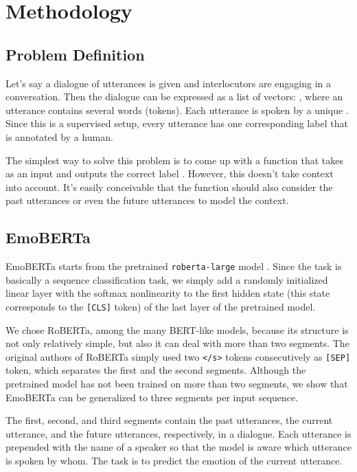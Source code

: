 \documentclass[11pt]{article}
\begin{document}
\section{Methodology}
\label{sec:method}

\subsection{Problem Definition}

Let's say a dialogue of  utterances is given and  interlocutors are engaging in a conversation. Then the dialogue can be expressed as a list of vectors: ,  where an utterance  contains several words (tokens). Each utterance  is spoken by a unique  . Since this is a supervised setup, every utterance  has one corresponding label  that is annotated by a human. 

The simplest way to solve this problem is to come up with a function  that takes  as an input and outputs the correct label . However, this doesn't take context into account. It's easily conceivable that the function  should also consider the past utterances  or even the future utterances  to model the context.


\subsection{EmoBERTa}

EmoBERTa starts from the pretrained \texttt{roberta-large} model \citep{liu2019roberta}. Since the task is basically a sequence classification task, we simply add a randomly initialized linear layer with the softmax nonlinearity to the first hidden state (this state corresponds to the \texttt{[CLS]} token) of the last layer of the pretrained model. 

We chose RoBERTa, among the many BERT-like models, because its structure is not only relatively simple, but also it can deal with more than two segments. The original authors of RoBERTa simply used two \texttt{</s>} tokens consecutively as \texttt{[SEP]} token, which separates the first and the second segments. Although the pretrained model has not been trained on more than two segments, we show that EmoBERTa can be generalized to three segments per input sequence. 

The first, second, and third segments contain the past utterances, the current utterance, and the future utterances, respectively, in a dialogue. Each utterance is prepended with the name of a speaker so that the model is aware which utterance is spoken by whom. The task is to predict the emotion of the current utterance.
\end{document}
